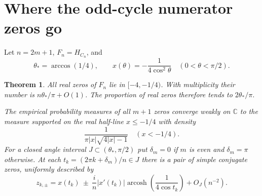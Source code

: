 \documentclass[11pt]{article}
\newtheorem{theorem}{Theorem}[section]
\DeclareMathOperator{\arcosh}{arcosh}
\begin{document}
\section{Where the odd-cycle numerator zeros go}
Let $n=2m+1$, $F_n=H_{C_n}$, and
\[
 \theta_* = \arccos(1/4),\qquad x(\theta)=-\frac{1}{4\cos^2\theta}\quad(0<\theta<\pi/2).
\]
\begin{theorem}\label{zeros}
All real zeros of $F_n$ lie in $[-4,-1/4)$. With multiplicity their number is $n\theta_*/\pi+O(1)$. The proportion of real zeros therefore tends to $2\theta_*/\pi$.

The empirical probability measures of \emph{all} $m+1$ zeros converge weakly on $\mathbb C$ to the measure supported on the real half-line $x\le-1/4$ with density
\[
 \frac{1}{\pi |x|\sqrt{4|x|-1}}\quad (x<-1/4).
\]
For a closed angle interval $J\subset(\theta_*,\pi/2)$ put $\delta_m=0$ if $m$ is even and $\delta_m=\pi$ otherwise. At each $t_k=(2\pi k+\delta_m)/n\in J$ there is a pair of simple conjugate zeros, uniformly described by
\[
 z_{k,\pm}=x(t_k)\ \pm\ \frac{i}{n}|x'(t_k)|\arcosh\!\left(\frac1{4\cos t_k}\right)
                 +O_J(n^{-2}).
\]
\end{theorem}
\end{document}
